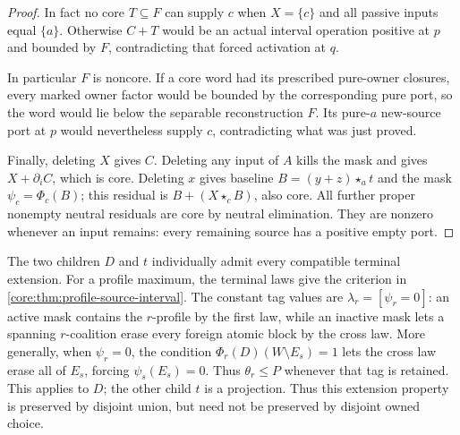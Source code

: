 \begin{proof}
In fact no core $T\subseteq F$ can supply $c$ when $X=\{c\}$ and
all passive inputs equal $\{a\}$. Otherwise $C+T$ would be an actual
interval operation positive at $p$ and bounded by $F$, contradicting
that forced activation at $q$.

In particular $F$ is noncore. If a core word had its prescribed
pure-owner closures, every marked owner factor would be bounded by
the corresponding pure port, so the word would lie below the
separable reconstruction $F$. Its pure-$a$ new-source port at $p$
would nevertheless supply $c$, contradicting what was just proved.

Finally, deleting $X$ gives $C$. Deleting any input of $A$ kills the
mask and gives $X+\partial_iC$, which is core. Deleting $x$ gives
baseline $B=(y+z)\star_a t$ and the mask
$\psi_c=\Phi_c(B)$; this residual is
$B+(X\star_c B)$, also core. All further proper nonempty neutral
residuals are core by neutral elimination.
They are nonzero whenever an input remains: every remaining source
has a positive empty port.
\end{proof}

The two children $D$ and $t$ individually admit every compatible
terminal extension. For a profile maximum, the terminal laws give the
criterion in \cref{core:thm:profile-source-interval}. The constant tag
values are $\lambda_r=[\psi_r=0]$: an active mask contains the
$r$-profile by the first law, while an inactive mask lets a spanning
$r$-coalition erase every foreign atomic block by the cross law.
More generally, when $\psi_r=0$, the condition
$\Phi_r(D)(W\setminus E_s)=1$ lets the cross law erase all of
$E_s$, forcing $\psi_s(E_s)=0$. Thus $\theta_r\leq P$ whenever that
tag is retained. This applies to $D$; the other child $t$ is a projection.
Thus this extension property is preserved by disjoint union, but need
not be preserved by disjoint owned choice.
